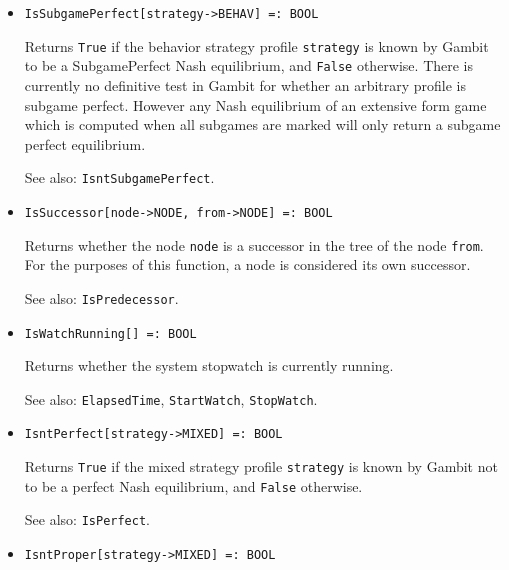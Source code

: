 \begin{itemize}
\item
\protect \large \begin{verbatim}
IsSubgamePerfect[strategy->BEHAV] =: BOOL
\end{verbatim}\normalsize

\bd Returns \verb+True+ if the behavior strategy profile
\verb+strategy+ is known by Gambit to be a SubgamePerfect Nash
equilibrium, and \verb+False+ otherwise.  There is currently no
definitive test in Gambit for whether an arbitrary profile is subgame
perfect.  However any Nash equilibrium of an extensive form game which
is computed when all subgames are marked will only return a subgame
perfect equilibrium.  
\item
[See also:] {\tt IsntSubgamePerfect}.
\ed

\item
\protect \large \begin{verbatim}
IsSuccessor[node->NODE, from->NODE] =: BOOL
\end{verbatim}\normalsize

\bd
Returns whether the node \verb+node+ is a successor
in the tree of the node \verb+from+.  For the purposes of this function,
a node is considered its own successor.
\item
[See also:] {\tt IsPredecessor}.
\ed

\item
\protect \large \begin{verbatim}
IsWatchRunning[] =: BOOL
\end{verbatim}\normalsize

\bd
Returns whether the system stopwatch is currently running.
\item
[See also:] {\tt ElapsedTime}, {\tt StartWatch}, {\tt StopWatch}.
\ed

\item
\protect \large \begin{verbatim}
IsntPerfect[strategy->MIXED] =: BOOL
\end{verbatim}\normalsize

\bd Returns \verb+True+ if the mixed strategy profile \verb+strategy+
is known by Gambit not to be a perfect Nash equilibrium, and \verb+False+
otherwise.  
\item
[See also:] {\tt IsPerfect}.
\ed

\item
\protect \large \begin{verbatim}
IsntProper[strategy->MIXED] =: BOOL
\end{verbatim}\normalsize


\end{itemize}
